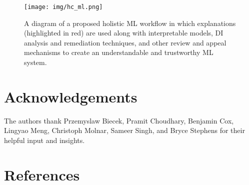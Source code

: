 \documentclass{article}
\begin{document}
\begin{figure}[htb!]
	\begin{center}
		\texttt{[image: img/hc\_ml.png]}
		\caption{A diagram of a proposed holistic ML workflow in which explanations (highlighted in red) are used along with interpretable models, DI analysis and remediation techniques, and other review and appeal mechanisms to create an understandable and trustworthy ML system.}
		\label{fig:hc_ml}
	\end{center}
\end{figure}

\clearpage
\section*{Acknowledgements}

The authors thank Przemyslaw Biecek, Pramit Choudhary, Benjamin Cox, Lingyao Meng, Christoph Molnar, Sameer Singh, and Bryce Stephens for their helpful input and insights.

\section*{References}
\small


\end{document}
